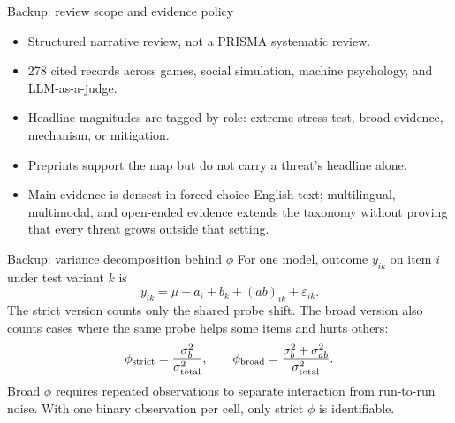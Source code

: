 \documentclass[aspectratio=169,10pt]{beamer}
\begin{document}
\appendix

\begin{frame}{Backup: review scope and evidence policy}
  \begin{itemize}\setlength\itemsep{0.28cm}
    \item Structured narrative review, not a PRISMA systematic review.
    \item 278 cited records across games, social simulation, machine psychology,
          and LLM-as-a-judge.
    \item Headline magnitudes are tagged by role: extreme stress test, broad
          evidence, mechanism, or mitigation.
    \item Preprints support the map but do not carry a threat's headline alone.
    \item Main evidence is densest in forced-choice English text; multilingual,
          multimodal, and open-ended evidence extends the taxonomy without proving
          that every threat grows outside that setting.
  \end{itemize}
\end{frame}

\begin{frame}{Backup: variance decomposition behind \texorpdfstring{$\phi$}{phi}}
  \small
  For one model, outcome $y_{ik}$ on item $i$ under test variant $k$ is
  \[
    y_{ik}=\mu+a_i+b_k+(ab)_{ik}+\varepsilon_{ik}.
  \]
  The strict version counts only the shared probe shift. The broad version also
  counts cases where the same probe helps some items and hurts others:
  \[
    \phi_{\rm strict}=\frac{\sigma_b^2}{\sigma_{\rm total}^2},
    \qquad
    \phi_{\rm broad}=\frac{\sigma_b^2+\sigma_{ab}^2}{\sigma_{\rm total}^2}.
  \]
  Broad $\phi$ requires repeated observations to separate interaction from
  run-to-run noise. With one binary observation per cell, only strict $\phi$ is
  identifiable.
  \vspace{0.35cm}
\end{frame}
\end{document}
